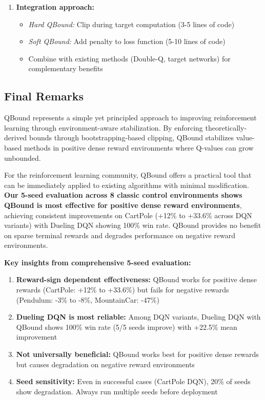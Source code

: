 \documentclass[11pt]{article}
\theoremstyle{definition}
\theoremstyle{remark}
\begin{document}
\begin{enumerate}
    \item \textbf{Integration approach:}
        \begin{itemize}
            \item \textit{Hard QBound:} Clip during target computation (3-5 lines of code)
            \item \textit{Soft QBound:} Add penalty to loss function (5-10 lines of code)
            \item Combine with existing methods (Double-Q, target networks) for complementary benefits
        \end{itemize}
\end{enumerate}

\subsection{Final Remarks}

QBound represents a simple yet principled approach to improving reinforcement learning through environment-aware stabilization. By enforcing theoretically-derived bounds through bootstrapping-based clipping, QBound stabilizes value-based methods in positive dense reward environments where Q-values can grow unbounded.

For the reinforcement learning community, QBound offers a practical tool that can be immediately applied to existing algorithms with minimal modification. \textbf{Our 5-seed evaluation across 8 classic control environments shows QBound is most effective for positive dense reward environments}, achieving consistent improvements on CartPole (+12\% to +33.6\% across DQN variants) with Dueling DQN showing 100\% win rate. QBound provides no benefit on sparse terminal rewards and degrades performance on negative reward environments.

\textbf{Key insights from comprehensive 5-seed evaluation:}
\begin{enumerate}
    \item \textbf{Reward-sign dependent effectiveness:} QBound works for positive dense rewards (CartPole: +12\% to +33.6\%) but fails for negative rewards (Pendulum: -3\% to -8\%, MountainCar: -47\%)

    \item \textbf{Dueling DQN is most reliable:} Among DQN variants, Dueling DQN with QBound shows 100\% win rate (5/5 seeds improve) with +22.5\% mean improvement

    \item \textbf{Not universally beneficial:} QBound works best for positive dense rewards but causes degradation on negative reward environments

    \item \textbf{Seed sensitivity:} Even in successful cases (CartPole DQN), 20\% of seeds show degradation. Always run multiple seeds before deployment
\end{enumerate}
\end{document}
